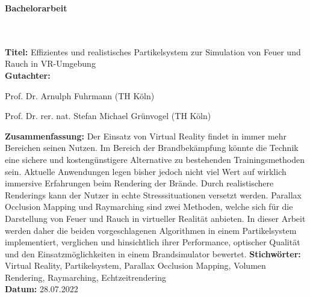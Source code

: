 \addtocounter{page}{1}

\begin{flushleft}
	\begin{huge}
		\textbf{Bachelorarbeit}
	\end{huge}
	~\\
	~\\
	\textbf{Titel:}  Effizientes und realistisches Partikelsystem zur Simulation von Feuer und Rauch in VR-Umgebung
	~\\
	\doublespacing
	\textbf{Gutachter:}
	\begin{description}
		\vspace{-0.2cm}
		\itemsep-8pt
		\item[–]
			Prof. Dr. Arnulph Fuhrmann (TH Köln)
		\item[–]
			Prof. Dr. rer. nat. Stefan Michael Grünvogel (TH Köln)
	\end{description}
	\vspace{-0.4cm}
	\singlespacing
	\textbf{Zusammenfassung:} Der Einsatz von Virtual Reality findet in immer mehr Bereichen
	seinen Nutzen. Im Bereich der Brandbekämpfung könnte die Technik eine sichere und
	kostengünstigere Alternative zu bestehenden Trainingsmethoden sein.
	Aktuelle Anwendungen legen bisher jedoch nicht viel Wert auf wirklich immersive Erfahrungen
	beim Rendering der Brände. Durch realistischere Renderings kann der Nutzer in echte Stresssituationen
	versetzt werden. Parallax Occlusion Mapping und Raymarching sind zwei Methoden, welche sich für die
	Darstellung von Feuer und Rauch in virtueller Realität anbieten.
	In dieser Arbeit werden daher die beiden vorgeschlagenen Algorithmen in einem Partikelsystem implementiert, verglichen und
	hinsichtlich ihrer Performance, optischer Qualität und den Einsatzmöglichkeiten in einem Brandsimulator bewertet.
	\singlespacing
	\textbf{Stichwörter:} Virtual Reality, Partikelsystem, Parallax Occlusion Mapping, Volumen Rendering, Raymarching, Echtzeitrendering\\
	\doublespacing
	\textbf{Datum:} 28.07.2022


	\vspace{1cm}


\end{flushleft}

